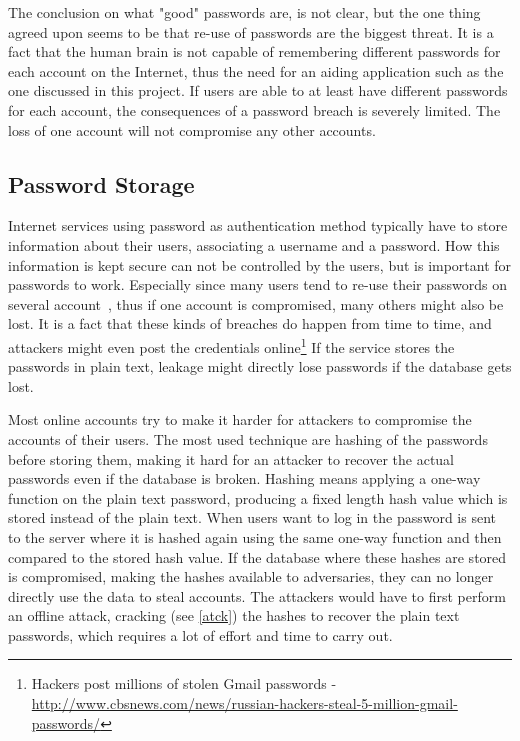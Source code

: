 \par The conclusion on what "good" passwords are, is not clear, but the one thing agreed upon seems to be that re-use of passwords are the biggest threat. It is a fact that the human brain is not capable of remembering different passwords for each account on the Internet, thus the need for an aiding application such as the one discussed in this project. If users are able to at least have different passwords for each account, the consequences of a password breach is severely limited. The loss of one account will not compromise any other accounts. 

\subsection{Password Storage}\label{pw-storage}
Internet services using password as authentication method typically have to store information about their users, associating a username and a password. How this information is kept secure can not be controlled by the users, but is important for passwords to work. Especially since many users tend to re-use their passwords on several account~\cite{domino-effect}, thus if one account is compromised, many others might also be lost. It is a fact that these kinds of breaches do happen from time to time, and attackers might even post the credentials online\footnote{Hackers post millions of stolen Gmail passwords - \url{http://www.cbsnews.com/news/russian-hackers-steal-5-million-gmail-passwords/} } If the service stores the passwords in plain text, leakage might directly lose passwords if the database gets lost.
\par Most online accounts try to make it harder for attackers to compromise the accounts of their users. The most used technique are hashing of the passwords before storing them, making it hard for an attacker to recover the actual passwords even if the database is broken. Hashing means applying a one-way function on the plain text password, producing a fixed length hash value which is stored instead of the plain text. When users want to log in the password is sent to the server where it is hashed again using the same one-way function and then compared to the stored hash value. If the database where these hashes are stored is compromised, making the hashes available to adversaries, they can no longer directly use the data to steal accounts. The attackers would have to first perform an offline attack, cracking (see \autoref{atck}) the hashes to recover the plain text passwords, which requires a lot of effort and time to carry out. 
